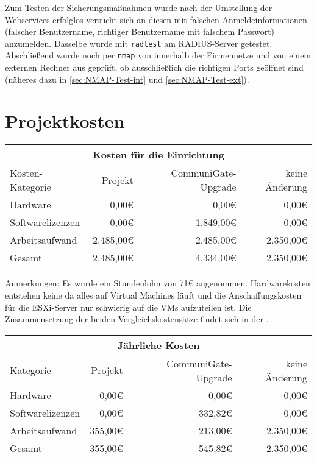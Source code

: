 \documentclass[11pt,a4paper,titlepage=firstiscover,headsepline,bibtotoc]{scrartcl} %
\newcommand{\hilight}[1]{\colorbox{yellow}{#1}} %
\newcommand{\mcc}[2]{\multicolumn{#1}{|c|}{#2}} %
\begin{document}
\medskip \noindent
Zum Testen der Sicherungsmaßnahmen wurde nach der Umstellung der Webservices erfolglos versucht sich an diesen mit falschen Anmeldeinformationen (falscher Benutzername, richtiger Benutzername mit falschem Passwort) anzumelden. Dasselbe wurde mit \texttt{radtest} am RADIUS-Server getestet.
Abschließend wurde noch per \texttt{nmap} von innerhalb der Firmennetze und von einem externen Rechner aus geprüft, ob ausschließlich die richtigen Ports geöffnet sind (näheres dazu in \autoref{sec:NMAP-Test-int} und \autoref{sec:NMAP-Test-ext}).


\section{Projektkosten}\label{sec:Kosten}
\begin{tabularx}{\textwidth}{|X|r|r|r|}
\hline
\mcc{4}{Kosten für die Einrichtung}\\
\hline
Kosten-Kategorie	&	Projekt &	CommuniGate-Upgrade &	keine Änderung\\
\hline
Hardware &	0,00\euro{} &	0,00\euro{} &	0,00\euro{}\\
\hline
Softwarelizenzen &	0,00\euro{} &	1.849,00\euro{} &	0,00\euro{}\\
\hline
Arbeitsaufwand &	2.485,00\euro{} &	2.485,00\euro{} &	2.350,00\euro{}\\
\hhline{|=|=|=|=|}
Gesamt &	2.485,00\euro{} &	4.334,00\euro{} &	2.350,00\euro{}\\
\hline
\end{tabularx}

\medskip \noindent Anmerkungen: Es wurde ein Stundenlohn von 71\euro{} angenommen. Hardwarekosten entstehen keine da alles auf Virtual Machines läuft und die Anschaffungskosten für die ESXi-Server nur schwierig auf die VMs aufzuteilen ist. Die Zusammensetzung der beiden Vergleichskostensätze findet sich in der .

\bigskip\noindent
\begin{tabularx}{\textwidth}{|X|r|r|r|}
\hline
\mcc{4}{Jährliche Kosten}\\
\hline
Kategorie	&	Projekt &	CommuniGate-Upgrade &	keine Änderung\\
\hline
Hardware &	0,00\euro{} &	0,00\euro{} &	0,00\euro{}\\
\hline
Softwarelizenzen &	0,00\euro{} &	332,82\euro{} &	0,00\euro{}\\
\hline
Arbeitsaufwand &	355,00\euro{} &	213,00\euro{} &	2.350,00\euro{}\\
\hhline{|=|=|=|=|}
Gesamt &	355,00\euro{} &	545,82\euro{} &	2.350,00\euro{}\\
\hline
\end{tabularx}
\end{document}
